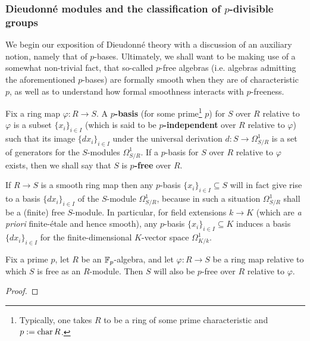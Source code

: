         \subsubsection{Dieudonn\'e modules and the classification of \texorpdfstring{$p$}{}-divisible groups}
            We begin our exposition of Dieudonn\'e theory with a discussion of an auxiliary notion, namely that of $p$-bases. Ultimately, we shall want to be making use of a somewhat non-trivial fact, that so-called $p$-free algebras (i.e. algebras admitting the aforementioned $p$-bases) are formally smooth when they are of characteristic $p$, as well as to understand how formal smoothness interacts with $p$-freeness.
            \begin{definition}[$p$-bases] \label{def: p_bases}
                Fix a ring map $\varphi: R \to S$. A \textbf{$p$-basis} (for some prime\footnote{Typically, one takes $R$ to be a ring of some prime characteristic and $p := \operatorname{char} R$.} $p$) for $S$ over $R$ relative to $\varphi$ is a subset $\{x_i\}_{i \in I}$ (which is said to be \textbf{$p$-independent} over $R$ relative to $\varphi$) such that its image $\{dx_i\}_{i \in I}$ under the universal derivation $d: S \to \Omega^1_{S/R}$ is a set of generators for the $S$-modules $\Omega^1_{S/R}$. If a $p$-basis for $S$ over $R$ relative to $\varphi$ exists, then we shall say that $S$ is \textbf{$p$-free} over $R$.
            \end{definition}
            \begin{remark}
                If $R \to S$ is a smooth ring map then any $p$-basis $\{x_i\}_{i \in I} \subseteq S$ will in fact give rise to a basis $\{dx_i\}_{i \in I}$ of the $S$-module $\Omega^1_{S/R}$, because in such a situation $\Omega^1_{S/R}$ shall be a (finite) free $S$-module. In particular, for field extensions $k \to K$ (which are \textit{a priori} finite-\'etale and hence smooth), any $p$-basis $\{x_i\}_{i \in I} \subseteq K$ induces a basis $\{dx_i\}_{i \in I}$ for the finite-dimensional $K$-vector space $\Omega^1_{K/k}$. 
            \end{remark}
            \begin{proposition} \label{prop: existence_of_p_bases}
                Fix a prime $p$, let $R$ be an $\mathbb{F}_p$-algebra, and let $\varphi: R \to S$ be a ring map relative to which $S$ is free as an $R$-module. Then $S$ will also be $p$-free over $R$ relative to $\varphi$.
            \end{proposition}
                \begin{proof}
                    
                \end{proof}
